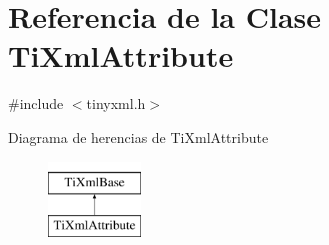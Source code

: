 \hypertarget{classTiXmlAttribute}{\section{\-Referencia de la \-Clase \-Ti\-Xml\-Attribute}
\label{classTiXmlAttribute}
}


{\ttfamily \#include $<$tinyxml.\-h$>$}

\-Diagrama de herencias de \-Ti\-Xml\-Attribute\begin{figure}[H]
\begin{center}
\leavevmode
\includegraphics[height=2.000000cm]{classTiXmlAttribute}
\end{center}
\end{figure}
